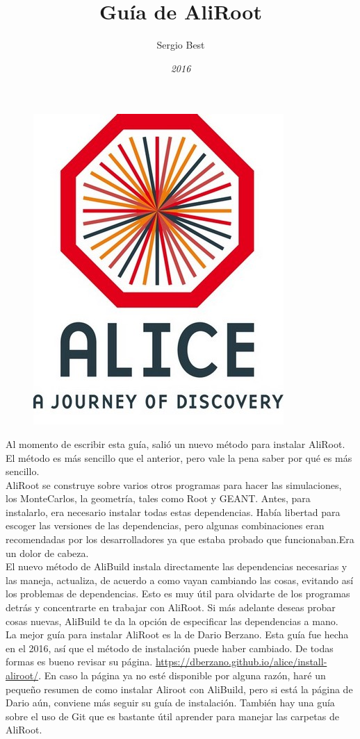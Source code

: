 \documentclass{article}
\title{\bf{Gu\'ia de AliRoot}}
\author{Sergio Best}
\date{\it{2016}}
\begin{document}
    \begin{figure}
    \begin{center}
    \includegraphics[scale=1.0]{alilogo.jpg}
    \end{center}
    \end{figure}
\maketitle


Al momento de escribir esta gu\'ia, sali\'o un nuevo m\'etodo para instalar AliRoot. El m\'etodo es m\'as sencillo que el anterior, pero vale la pena saber por qu\'e es m\'as sencillo.\\
AliRoot se construye sobre varios otros programas para hacer las simulaciones, los MonteCarlos, la geometr\'ia, tales como Root y GEANT. Antes, para instalarlo, era necesario instalar todas estas dependencias. Hab\'ia libertad para escoger las versiones de las dependencias, pero algunas combinaciones eran recomendadas por los desarrolladores ya que estaba probado que funcionaban.Era un dolor de cabeza.\\
El nuevo m\'etodo de AliBuild instala directamente las dependencias necesarias y las maneja, actualiza, de acuerdo a como vayan cambiando las cosas, evitando as\'i los problemas de dependencias. Esto es muy \'util para olvidarte de los programas detr\'as y concentrarte en trabajar con AliRoot. Si m\'as adelante deseas probar cosas nuevas, AliBuild te da la opci\'on de especificar las dependencias a mano.\\
La mejor gu\'ia para instalar AliRoot es la de Dario Berzano. Esta gu\'ia fue hecha en el 2016, as\'i que el m\'etodo de instalaci\'on puede haber cambiado. De todas formas es bueno revisar su p\'agina. \url{https://dberzano.github.io/alice/install-aliroot/}. En caso la p\'agina ya no est\'e disponible por alguna raz\'on, har\'e un pequeño resumen de como instalar Aliroot con AliBuild, pero si est\'a la p\'agina de Dario a\'un, conviene m\'as seguir su gu\'ia de instalaci\'on. Tambi\'en hay una gu\'ia sobre el uso de Git que es bastante \'util aprender para manejar las carpetas de AliRoot.
\end{document}
